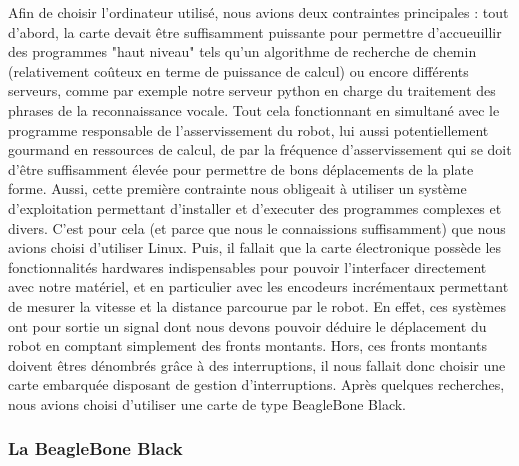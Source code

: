 \documentclass{report}
\begin{document}
    {Afin de choisir l'ordinateur utilisé, nous avions deux contraintes principales :
    tout d'abord, la carte devait être suffisamment puissante pour permettre
    d'accueuillir des programmes "haut niveau" tels qu'un algorithme de recherche de chemin
    (relativement coûteux en terme de puissance de calcul) ou encore différents
    serveurs, comme par exemple notre serveur python en charge du traitement des
    phrases de la reconnaissance vocale. Tout cela fonctionnant en simultané avec
    le programme responsable de l'asservissement du robot, lui aussi potentiellement
    gourmand en ressources de calcul, de par la fréquence d'asservissement qui se doit
    d'être suffisamment élevée pour permettre de bons déplacements de la plate forme.
    Aussi, cette première contrainte nous obligeait à utiliser un système d'exploitation
    permettant d'installer et d'executer des programmes complexes et divers. C'est pour
    cela (et parce que nous le connaissions suffisamment) que nous avions choisi
    d'utiliser Linux.}
    {Puis, il fallait que la carte électronique possède les fonctionnalités
    hardwares indispensables pour pouvoir l'interfacer directement avec notre matériel,
    et en particulier avec les encodeurs incrémentaux permettant de mesurer la
    vitesse et la distance parcourue par le robot. En effet, ces systèmes ont pour
    sortie un signal dont nous devons pouvoir déduire le déplacement du robot en
    comptant simplement des fronts montants. Hors, ces fronts montants
    doivent êtres dénombrés grâce à des interruptions, il nous fallait donc choisir
    une carte embarquée disposant de gestion d'interruptions. Après quelques recherches,
    nous avions choisi d'utiliser une carte de type BeagleBone Black.}

    \subsubsection{La BeagleBone Black}
\end{document}
